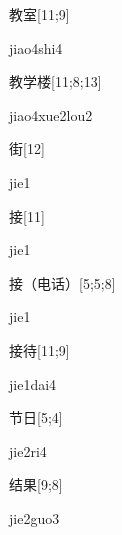 \begin{verbete}{教室}[11;9]
\begin{pronuncia}{jiao4shi4}
\end{pronuncia}
\end{verbete}

\begin{verbete}{教学楼}[11;8;13]
\begin{pronuncia}{jiao4xue2lou2}
\end{pronuncia}
\end{verbete}

\begin{verbete}[jie1]{街}[12]
\begin{pronuncia}{jie1}
\end{pronuncia}
\end{verbete}

\begin{verbete}[jie1]{接}[11]
\begin{pronuncia}{jie1}
\end{pronuncia}
\end{verbete}

\begin{verbete}[jie1]{接（电话）}[5;5;8]
\begin{pronuncia}{jie1}
\end{pronuncia}
\end{verbete}

\begin{verbete}{接待}[11;9]
\begin{pronuncia}{jie1dai4}
\end{pronuncia}
\end{verbete}

\begin{verbete}[jie2ri4]{节日}[5;4]
\begin{pronuncia}{jie2ri4}
\end{pronuncia}
\end{verbete}

\begin{verbete}{结果}[9;8]
\begin{pronuncia}{jie2guo3}
\end{pronuncia}
\end{verbete}


